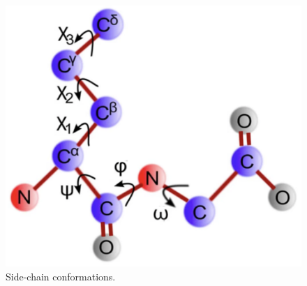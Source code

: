 \begin{figure}[th!]
    \centering
    \includegraphics[width=\textwidth]{introduction/angles.png}
    \caption{Side-chain conformations.}
    \label{fig:angles_aa}
    \small
\end{figure}

